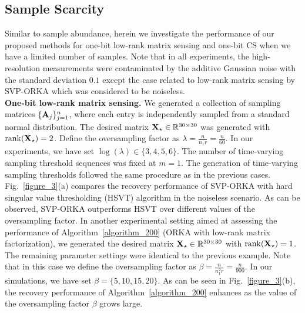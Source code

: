 \documentclass[12pt,draftcls,onecolumn]{IEEEtran}
\begin{document}
\subsection{Sample Scarcity}
Similar to sample abundance, herein we investigate the performance of our proposed methods for one-bit low-rank matrix sensing and one-bit CS when we have a limited number of samples. Note that in all experiments, the high-resolution measurements were contaminated by the additive Gaussian noise with the standard deviation $0.1$ except the case related to low-rank matrix sensing by SVP-ORKA which was considered to be noiseless.
\\
\textbf{One-bit low-rank matrix sensing.} We generated a collection of sampling matrices $\{\mathbf{A}_j\}_{j=1}^{n}$, where each entry is independently sampled from a standard normal distribution. The desired matrix $\mathbf{X}_{\star}\in\mathbb{R}^{30\times 30}$ was generated with $\operatorname{rank}(\mathbf{X}_{\star})=2$. Define the oversampling factor as $\lambda=\frac{n}{n_1r}=\frac{n}{60}$. In our experiments, we have set 
$\log(\lambda)\in\{3,4,5,6\}$. The number of time-varying sampling threshold sequences was fixed at $m=1$. The generation of time-varying sampling thresholds followed the same procedure as in the previous cases. Fig.~\ref{figure_3}(a) compares the recovery performance of SVP-ORKA with hard singular value thresholding (HSVT) algorithm \cite{foucart2019recovering} in the noiseless scenario. As can be observed, SVP-ORKA outperforms HSVT over different values of the oversampling factor. In another experimental setting aimed at assessing the performance of Algorithm~\ref{algorithm_200} (ORKA with low-rank matrix factorization), we generated the desired matrix $\mathbf{X}_{\star}\in\mathbb{R}^{30\times 30}$ with $\operatorname{rank}(\mathbf{X}_{\star})=1$. The remaining parameter settings were identical to the previous example. Note that in this case we define the oversampling factor as $\beta=\frac{n}{n_1^2r}=\frac{n}{900}$. In our simulations, we have set $\beta=\{5,10,15,20\}$. As can be seen in Fig.~\ref{figure_3}(b), the recovery performance of Algorithm~\ref{algorithm_200} enhances as the value of the oversampling factor $\beta$ grows large.
\end{document}
